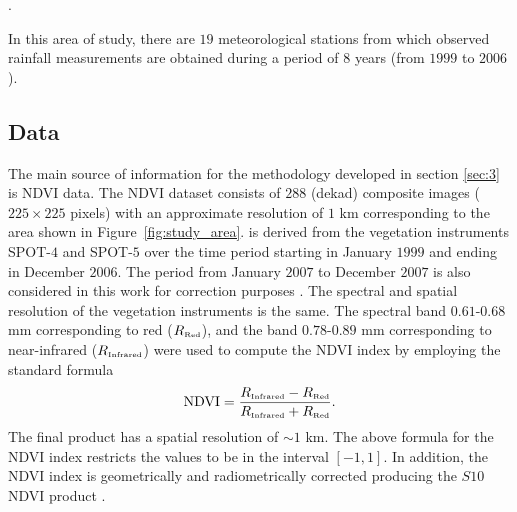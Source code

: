 \citep{Garreaud-et-al_2003}. {In this area of study, there are $19$ 
meteorological stations from which observed rainfall measurements are obtained 
during a period of $8$ years (from $1999$ to $2006$).  

\subsection{Data}\label{subsubsec:2_2}

The main source of information for the methodology developed in section \ref{sec:3} is NDVI data. The NDVI dataset consists of $288$ (dekad) composite images 
{($225\times 225$ pixels) with an approximate resolution of $1$ km 
corresponding to the area} shown in Figure~\ref{fig:study_area}.  is derived from the vegetation instruments SPOT-$4$ and SPOT-$5$ over the time period starting in January $1999$ and ending in December $2006$. The period from January $2007$ to December $2007$ is also considered in this work for 
correction purposes \citep{Quiroz-et-al_2011}.  The spectral and spatial 
resolution of the vegetation instruments is the same. The spectral band 
$0.61$-$0.68$ mm corresponding to red (${R}_{\mbox{\tiny Red}}$), and the band $0.78$-$0.89$ mm corresponding 
to near-infrared (${R}_{\mbox{\tiny Infrared}}$) were used to compute the NDVI index by employing the 
standard formula  
\begin{align} \label{eq:NDVI_definition}
\mbox{NDVI}= \frac{{R}_{\mbox{\tiny Infrared}} - {R}_{\mbox{\tiny Red}}}{{R}_{\mbox{\tiny Infrared}} + {R}_{\mbox{\tiny Red}}}.
\end{align}
The final product has a spatial resolution of $\sim1$ km. The above 
formula for the NDVI index restricts the values to be in the interval 
$[-1,1]$. In addition, the NDVI index is geometrically and radiometrically 
corrected producing the $S10$ NDVI product \citep{Immerzeel-et-al_2005}. }
